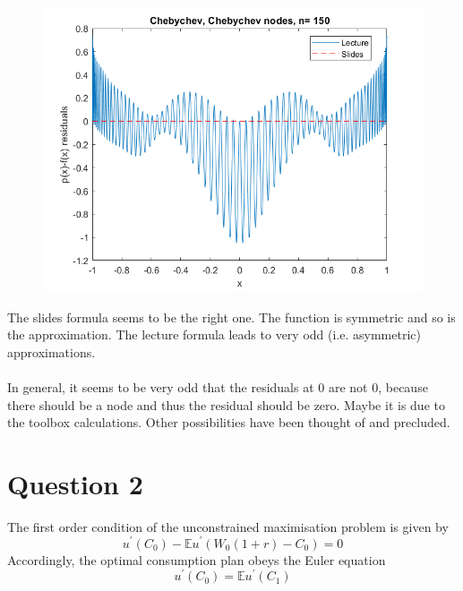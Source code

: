 \documentclass{article}
\begin{document}
\begin{figure}[h]
\begin{minipage}{0.56\textwidth}
	  \includegraphics[width = \textwidth, keepaspectratio]{n150lecsli.png}
    \end{minipage}   	   
    \end{figure}
    The slides formula seems to be the right one. The function is symmetric and so is the approximation. The lecture formula leads to very odd (i.e. asymmetric) approximations.\\\\
    In general, it seems to be very odd that the residuals at 0 are not 0, because there should be a node and thus the residual should be zero. Maybe it is due to the toolbox calculations. Other possibilities have been thought of and precluded.
\newpage

\section{Question 2}
The first order condition of the unconstrained maximisation problem is given by
\begin{equation*}
u^\prime(C_0) - \mathbb{E}u^\prime(W_0 (1+r) - C_0) = 0
\end{equation*}
Accordingly, the optimal consumption plan obeys the Euler equation
\begin{equation}
u^\prime(C_0) = \mathbb{E}u^\prime(C_1) \tag{Euler EQ}
\end{equation}
\end{document}
